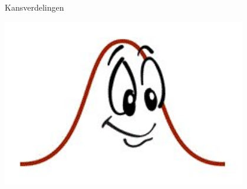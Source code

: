 \documentclass[12pt,twoside]{article}
\begin{document}
\thispagestyle{empty}
\begin{center}
  \begin{mdframed}
  \centering
  \fontsize{40}{60}\selectfont Kansverdelingen
  \end{mdframed}
  \includegraphics[width=0.8\textwidth]{normal}
\end{center}
\vspace*{-2cm}
\end{document}
